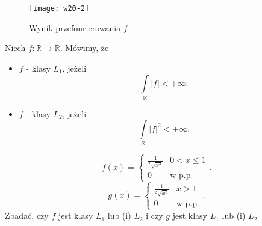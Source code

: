 \documentclass[../main.tex]{subfiles}
\begin{document}
 \begin{figure}[h]
     \centering
     \texttt{[image: w20-2]}
     \caption{Wynik przefourierowania $f$}
     \label{fig:w20-2}
 \end{figure}
 \begin{definicja}
     Niech $f: \mathbb{R}\to \mathbb{R}$. Mówimy, że
     \begin{itemize}
         \item $f$ - klasy $L_1$, jeżeli
              \[
             \int\limits_{\mathbb{R}}|f| < +\infty
             .\]
     \item $f$ - klasy $L_2$, jeżeli
         \[
         \int\limits_{\mathbb{R}}|f|^2 < +\infty
         .\]
     \end{itemize}
 \end{definicja}
 \begin{przyklad}
     \[
         f(x) = \begin{cases}
             \frac{1}{^2\sqrt{x^3}} & 0 < x \le 1\\
             0 & \text{w p.p.}
         \end{cases}
     .\]
 \[
     g(x) = \begin{cases}
         \frac{1}{^2\sqrt{x^3} }& x > 1\\
         0 & \text{w p.p.}
     \end{cases}
 .\]
 Zbadać, czy $f$ jest klasy $L_1$ lub (i) $L_2$ i czy $g$ jest klasy $L_1$ lub (i) $L_2$
 \end{przyklad}
\end{document}
